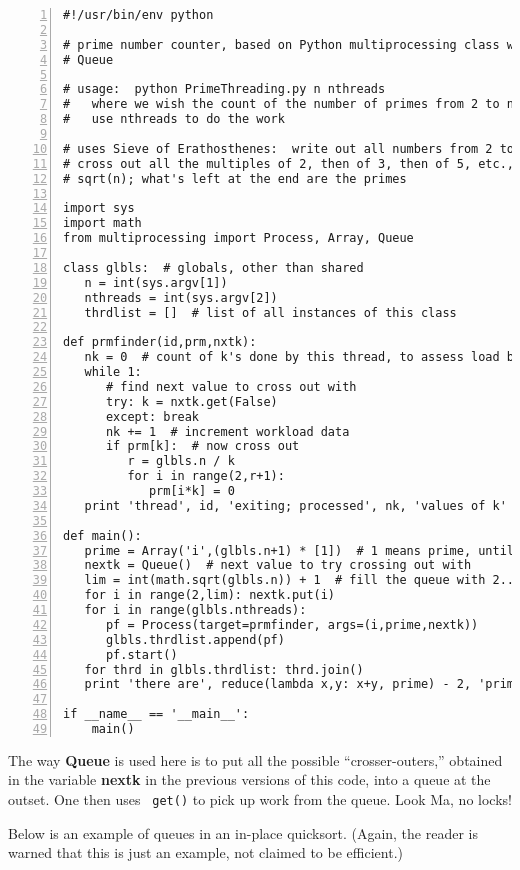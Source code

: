 \begin{Verbatim}[fontsize=\relsize{-2},numbers=left]
#!/usr/bin/env python

# prime number counter, based on Python multiprocessing class with
# Queue

# usage:  python PrimeThreading.py n nthreads 
#   where we wish the count of the number of primes from 2 to n, and to
#   use nthreads to do the work

# uses Sieve of Erathosthenes:  write out all numbers from 2 to n, then
# cross out all the multiples of 2, then of 3, then of 5, etc., up to
# sqrt(n); what's left at the end are the primes

import sys
import math
from multiprocessing import Process, Array, Queue

class glbls:  # globals, other than shared
   n = int(sys.argv[1])
   nthreads = int(sys.argv[2])
   thrdlist = []  # list of all instances of this class

def prmfinder(id,prm,nxtk):
   nk = 0  # count of k's done by this thread, to assess load balance
   while 1:
      # find next value to cross out with
      try: k = nxtk.get(False)
      except: break
      nk += 1  # increment workload data
      if prm[k]:  # now cross out
         r = glbls.n / k
         for i in range(2,r+1):
            prm[i*k] = 0
   print 'thread', id, 'exiting; processed', nk, 'values of k'

def main():
   prime = Array('i',(glbls.n+1) * [1])  # 1 means prime, until find otherwise
   nextk = Queue()  # next value to try crossing out with
   lim = int(math.sqrt(glbls.n)) + 1  # fill the queue with 2...sqrt(n)
   for i in range(2,lim): nextk.put(i)
   for i in range(glbls.nthreads):
      pf = Process(target=prmfinder, args=(i,prime,nextk))
      glbls.thrdlist.append(pf)
      pf.start()
   for thrd in glbls.thrdlist: thrd.join()
   print 'there are', reduce(lambda x,y: x+y, prime) - 2, 'primes'

if __name__ == '__main__':
    main()
\end{Verbatim}

The way {\bf Queue} is used here is to put all the possible
``crosser-outers,'' obtained in the variable {\bf nextk} in the previous
versions of this code, into a queue at the outset.  One then uses {\tt
get()} to pick up work from the queue.  Look Ma, no locks!

Below is an example of queues in an in-place quicksort.  (Again, the
reader is warned that this is just an example, not claimed to be
efficient.)


